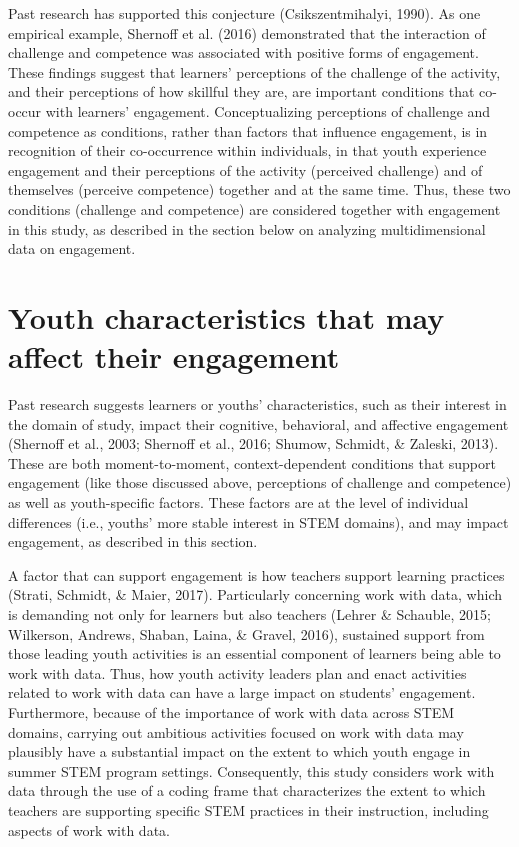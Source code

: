 \documentclass[]{msu-thesis}
\theoremstyle{definition}
\theoremstyle{definition}
\theoremstyle{definition}
\theoremstyle{remark}
\begin{document}
Past research has supported this conjecture (Csikszentmihalyi, 1990). As
one empirical example, Shernoff et al. (2016) demonstrated that the
interaction of challenge and competence was associated with positive
forms of engagement. These findings suggest that learners' perceptions
of the challenge of the activity, and their perceptions of how skillful
they are, are important conditions that co-occur with learners'
engagement. Conceptualizing perceptions of challenge and competence as
conditions, rather than factors that influence engagement, is in
recognition of their co-occurrence within individuals, in that youth
experience engagement and their perceptions of the activity (perceived
challenge) and of themselves (perceive competence) together and at the
same time. Thus, these two conditions (challenge and competence) are
considered together with engagement in this study, as described in the
section below on analyzing multidimensional data on engagement.

\section{Youth characteristics that may affect their
engagement}\label{youth-characteristics-that-may-affect-their-engagement}

Past research suggests learners or youths' characteristics, such as
their interest in the domain of study, impact their cognitive,
behavioral, and affective engagement (Shernoff et al., 2003; Shernoff et
al., 2016; Shumow, Schmidt, \& Zaleski, 2013). These are both
moment-to-moment, context-dependent conditions that support engagement
(like those discussed above, perceptions of challenge and competence) as
well as youth-specific factors. These factors are at the level of
individual differences (i.e., youths' more stable interest in STEM
domains), and may impact engagement, as described in this section.

A factor that can support engagement is how teachers support learning
practices (Strati, Schmidt, \& Maier, 2017). Particularly concerning
work with data, which is demanding not only for learners but also
teachers (Lehrer \& Schauble, 2015; Wilkerson, Andrews, Shaban, Laina,
\& Gravel, 2016), sustained support from those leading youth activities
is an essential component of learners being able to work with data.
Thus, how youth activity leaders plan and enact activities related to
work with data can have a large impact on students' engagement.
Furthermore, because of the importance of work with data across STEM
domains, carrying out ambitious activities focused on work with data may
plausibly have a substantial impact on the extent to which youth engage
in summer STEM program settings. Consequently, this study considers work
with data through the use of a coding frame that characterizes the
extent to which teachers are supporting specific STEM practices in their
instruction, including aspects of work with data.
\end{document}
